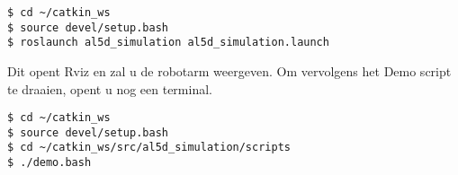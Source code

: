 \documentclass[11pt,titlepage]{article}
\begin{document}
\begin{verbatim}
$ cd ~/catkin_ws
$ source devel/setup.bash
$ roslaunch al5d_simulation al5d_simulation.launch 
\end{verbatim}

Dit opent Rviz en zal u de robotarm weergeven. Om vervolgens het Demo script te draaien, opent u nog een terminal.

\begin{verbatim}
$ cd ~/catkin_ws
$ source devel/setup.bash
$ cd ~/catkin_ws/src/al5d_simulation/scripts
$ ./demo.bash 
\end{verbatim}
\end{document}
